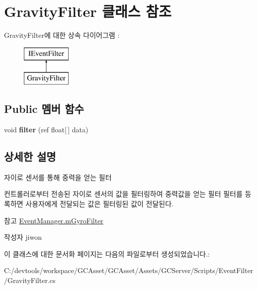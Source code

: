 \hypertarget{class_gravity_filter}{}\section{Gravity\+Filter 클래스 참조}
\label{class_gravity_filter}
Gravity\+Filter에 대한 상속 다이어그램 \+: \begin{figure}[H]
\begin{center}
\leavevmode
\includegraphics[height=2.000000cm]{class_gravity_filter}
\end{center}
\end{figure}
\subsection*{Public 멤버 함수}
\begin{DoxyCompactItemize}
\item 
\hypertarget{class_gravity_filter_ad397d715404a4057f13631b1b9978903}{}void {\bfseries filter} (ref float\mbox{[}$\,$\mbox{]} data)\label{class_gravity_filter_ad397d715404a4057f13631b1b9978903}

\end{DoxyCompactItemize}


\subsection{상세한 설명}
자이로 센서를 통해 중력을 얻는 필터

컨트롤러로부터 전송된 자이로 센서의 값을 필터링하여 중력값을 얻는 필터 필터를 등록하면 사용자에게 전달되는 값은 필터링된 값이 전달된다. \begin{DoxySeeAlso}{참고}
\hyperlink{class_event_manager_a7cee85488f5d7220c102cd945b1f494a}{Event\+Manager.\+m\+Gyro\+Filter} 
\end{DoxySeeAlso}
\begin{DoxyAuthor}{작성자}
jiwon 
\end{DoxyAuthor}


이 클래스에 대한 문서화 페이지는 다음의 파일로부터 생성되었습니다.\+:\begin{DoxyCompactItemize}
\item 
C\+:/devtools/workspace/\+G\+C\+Asset/\+G\+C\+Asset/\+Assets/\+G\+C\+Server/\+Scripts/\+Event\+Filter/Gravity\+Filter.\+cs\end{DoxyCompactItemize}
